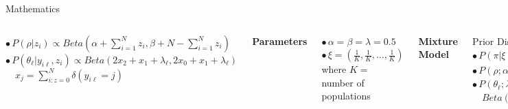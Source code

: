 \documentclass[letter,graphicx]{beamer}
\begin{document}
\begin{frame}{Mathematics}
\begin{tiny}
\begin{columns}[T]
$\bullet \, P(\rho|z_i) \propto Beta(\alpha + \sum_{i=1}^{N} z_i, \beta + N - \sum_{i=1}^{N} z_i)$ \\ \vspace{1mm}
$\bullet \,P(\theta_{\ell}|y_{i\ell},z_i) \propto Beta(2x_2 + x_1 + \lambda_{\ell}, 2x_0 + x_1 + \lambda_{\ell})$ \\ \vspace{1mm}
$\quad x_j = \sum_{i:z=0}^{N} \delta(y_{i\ell} = j)$\\

\vspace{3mm}
\centerline{\textbf{Parameters}}
\vspace{2mm}
$\bullet \, \alpha = \beta = \lambda = 0.5$ \\
\vspace{1mm}
$\bullet \, \xi = (\frac{1}{K}, \frac{1}{K}, \ldots, \frac{1}{K})$ where $K = $ number of populations
\vspace{3mm}



\column{2.5in}
\centerline{\textbf{Mixture Model}}
\vspace{2mm}
Prior Distributions \\ \vspace{1mm}
$\bullet \, P(\pi|\xi) \propto \prod_{i = 1}^K \pi_{i}^{\xi_i - 1} = Dirichlet(\xi_1, \ldots, \xi_K)$ \\
\vspace{1mm}
$\bullet \, P(\rho;\alpha,\beta) \propto \rho^{\alpha - 1}(1 - \rho)^{\beta - 1} = Beta(\alpha, \beta)$
$\bullet \, P(\theta_{\ell};\lambda_{\ell}) \propto \theta_{\ell}^{x_i + \lambda_{\ell}-1}(1 - \theta_{\ell})^{x_0 + \lambda_{\ell}-1} = $ \\ 
\vspace{1mm}
$\quad Beta(x_1 + \lambda_{\ell},x_0 + \lambda_{\ell})$ \\ 
\vspace{2mm}


\end{columns}
\end{tiny}
\end{frame}
\end{document}
